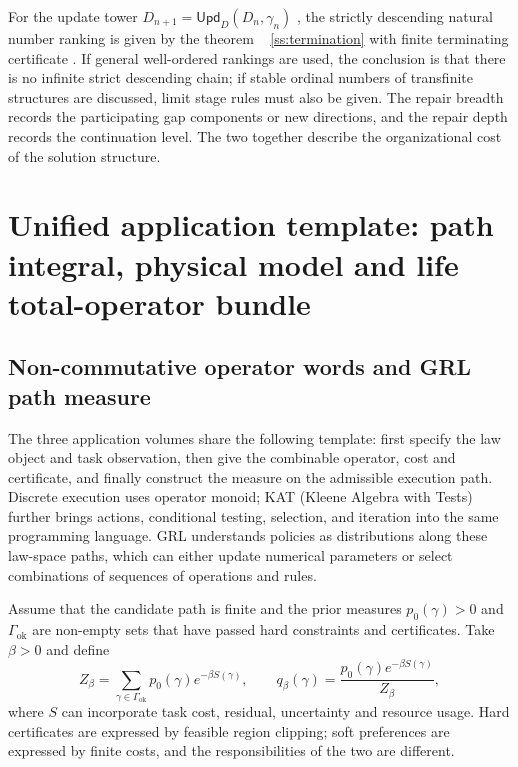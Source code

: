 \documentclass[11pt,a4paper]{article}
\theoremstyle{plain}
\theoremstyle{definition}
\theoremstyle{remark}
\begin{document}
\begin{CJK*}
For the update tower $D_{n+1}=\mathsf{Upd}_D(D_n,\gamma_n)$ , the strictly descending natural number ranking is given by the theorem ~ \ref{ss:termination} with finite terminating certificate . If general well-ordered rankings are used, the conclusion is that there is no infinite strict descending chain; if stable ordinal numbers of transfinite structures are discussed, limit stage rules must also be given. The repair breadth records the participating gap components or new directions, and the repair depth records the continuation level. The two together describe the organizational cost of the solution structure.

\section { Unified application template: path integral, physical model and life total-operator bundle }\label{fa:applications}


\subsection { Non-commutative operator words and GRL path measure }

The three application volumes share the following template: first specify the law object and task observation, then give the combinable operator, cost and certificate, and finally construct the measure on the admissible execution path. Discrete execution uses operator monoid; KAT (Kleene Algebra with Tests) further brings actions, conditional testing, selection, and iteration into the same programming language. GRL understands policies as distributions along these law-space paths, which can either update numerical parameters or select combinations of sequences of operations and rules. \cite{S02,S03,S04}

Assume that the candidate path is finite and the prior measures $p_0(\gamma)>0$ and $\Gamma_{\mathrm{ok}}$ are non-empty sets that have passed hard constraints and certificates. Take $\beta>0$ and define \[
 Z_\beta=\sum_{\gamma\in\Gamma_{\mathrm{ok}}}
 p_0(\gamma)e^{-\beta S(\gamma)},\qquad
 q_\beta(\gamma)=\frac{p_0(\gamma)e^{-\beta S(\gamma)}}{Z_\beta},
\] where $S$ can incorporate task cost, residual, uncertainty and resource usage. Hard certificates are expressed by feasible region clipping; soft preferences are expressed by finite costs, and the responsibilities of the two are different.


\end{CJK*}
\end{document}

